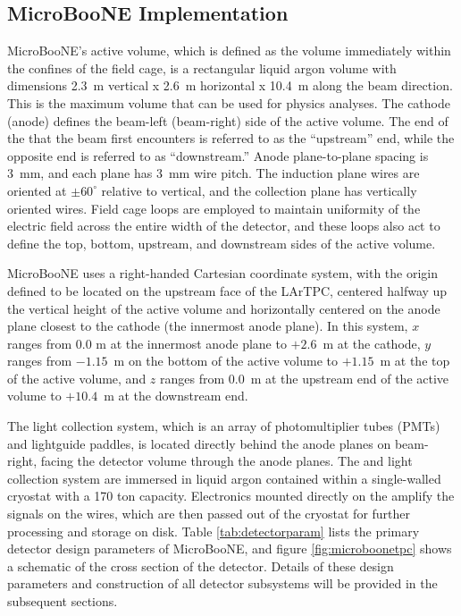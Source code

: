  


\subsection{MicroBooNE \lartpc Implementation}

MicroBooNE's \lartpc active volume, which is defined as the volume immediately within the confines of the \lartpc field cage, is a rectangular liquid argon volume with dimensions 2.3~m vertical x 2.6~m horizontal x 10.4~m along the beam direction. This is the maximum volume that can be used for physics analyses.  The cathode (anode) defines the beam-left (beam-right) side of the active volume.  The end of the \lartpc that the beam first encounters is referred to as the ``upstream'' end, while the opposite end is referred to as ``downstream.''  Anode plane-to-plane spacing is 3~mm, and each plane has 3~mm wire pitch. The induction plane wires are oriented at $\pm60^{\circ}$ relative to vertical, and the collection plane has vertically oriented wires. Field cage loops are employed to maintain uniformity of the electric field across the entire width of the detector, and these loops also act to define the top, bottom, upstream, and downstream sides of the active volume.  

MicroBooNE uses a right-handed Cartesian coordinate system, with the origin defined to be located on the upstream face of the LArTPC, centered halfway up the vertical height of the active volume and horizontally centered on the anode plane closest to the cathode (the innermost anode plane).  In this system, $x$ ranges from 0.0 m at the innermost anode plane to $+2.6$~m at the cathode, $y$ ranges from $-1.15$~m on the bottom of the active volume to $+1.15$~m at the top of the active volume, and $z$ ranges from 0.0~m at the upstream end of the active volume to $+10.4$~m at the downstream end.  

The light collection system, which is an array of photomultiplier tubes (PMTs) and lightguide paddles, is located directly behind the anode planes on beam-right, facing the detector volume through the anode planes.  The \lartpc and light collection system are immersed in liquid argon contained within a single-walled cryostat with a 170 ton capacity.  Electronics mounted directly on the \lartpc amplify the signals on the wires, which are then passed out of the cryostat for further processing and storage on disk.  Table \ref{tab:detectorparam} lists the primary detector design parameters of MicroBooNE, and figure \ref{fig:microboonetpc} shows a schematic of the cross section of the detector. Details of these design parameters and construction of all detector subsystems will be provided in the subsequent sections.

